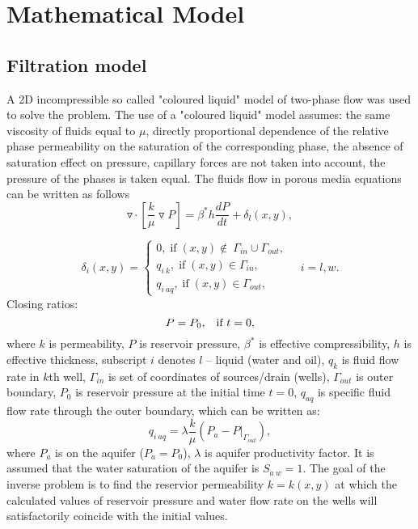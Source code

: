 \documentclass{article}
\begin{document}
\section{Mathematical Model}

\subsection{Filtration model}
A 2D incompressible so called "coloured liquid" model of two-phase flow \cite{bas} was used to solve the problem. The use of a "coloured liquid" model assumes: the same viscosity of fluids equal to $\mu$, directly proportional dependence of the relative phase permeability on the saturation of the corresponding phase, the absence of saturation effect on pressure, capillary forces are not taken into account, the pressure of the phases is taken equal. The fluids flow in porous media
equations can be written as follows
\begin{equation} \label{fil}
	\triangledown \cdot \left[\frac{k}{\mu}\triangledown P \right] = \beta^*h\frac{dP}{dt} + \delta_{l}(x,y),
\end{equation}

\begin{equation} \label{bc}
	\delta_{i}(x,y)  = \left\{\begin{array}{crl}
		0, \;\mbox{if}\;(x,y) \notin\ \Gamma_{in}\cup\Gamma_{out},\\
		q_{i\:k}, \;\mbox{if}\;(x,y) \in \Gamma_{in},\\
		q_{i\:aq}, \;\mbox{if}\;(x,y) \in \Gamma_{out},
	\end{array}\right. \quad i = l,w.
\end{equation}
Closing ratios:
\begin{equation} \label{kr}
P = P_0\mbox{,\quad \mbox{if} $t=0$},
\end{equation}
where $k$ is permeability, $P$ is reservoir pressure, $\beta^*$ is
effective compressibility, $h$ is effective thickness, subscript $i$ denotes $l$ -- liquid
(water and oil), $q_k$ is fluid flow rate in $k$th well, $\Gamma_{in}$
is set of coordinates of sources/drain (wells), $\Gamma_{out}$ is
outer boundary, $P_0$ is reservoir pressure at the initial time $t=0$, $q_{aq}$ is specific fluid flow rate through the outer boundary, which can be written as:
\begin{equation*} \label{qaq}
	q_{i\:aq} = \lambda \frac{k}{\mu}(P_{a} - P|_{\Gamma_{out}}),
\end{equation*}
where $P_a$ is on the aquifer ($P_a = P_0$), $\lambda$ is
aquifer productivity factor. It is assumed that the water saturation
of the aquifer is $S_{a\:w} = 1$. The goal of the inverse problem is to find the reservior permeability  $k = k(x,y)$ at which the calculated values of reservoir pressure and water flow rate on the wells will satisfactorily coincide with the initial values.
\end{document}

